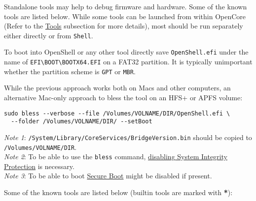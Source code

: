 \documentclass[]{article}
\begin{document}
Standalone tools may help to debug firmware and hardware. Some of the known tools are listed below.
While some tools can be launched from within OpenCore (Refer to the \hyperref[misctools]{Tools} subsection
for more details), most should be run separately either directly or from \texttt{Shell}.

To boot into OpenShell or any other tool directly save \texttt{OpenShell.efi}
under the name of \texttt{EFI\textbackslash BOOT\textbackslash BOOTX64.EFI}
on a FAT32 partition. It is typically unimportant whether the partition scheme
is \texttt{GPT} or \texttt{MBR}.

While the previous approach works both on Macs and other computers,
an alternative Mac-only approach to bless the tool on an HFS+ or APFS
volume:

\begin{lstlisting}[caption=Blessing tool, label=blesstool, style=ocbash]
sudo bless --verbose --file /Volumes/VOLNAME/DIR/OpenShell.efi \
  --folder /Volumes/VOLNAME/DIR/ --setBoot
\end{lstlisting}

\emph{Note 1}: \texttt{/System/Library/CoreServices/BridgeVersion.bin} should be copied
  to \texttt{/Volumes/VOLNAME/DIR}. \\
\emph{Note 2}: To be able to use the \texttt{bless} command,
  \href{https://developer.apple.com/library/archive/documentation/Security/Conceptual/System_Integrity_Protection_Guide/ConfiguringSystemIntegrityProtection/ConfiguringSystemIntegrityProtection.html}{disabling System Integrity Protection} is necessary. \\
\emph{Note 3}: To be able to boot \href{https://support.apple.com/HT208330}{Secure Boot}
  might be disabled if present.

Some of the known tools are listed below (builtin tools are marked with \textbf{*}):
\end{document}

